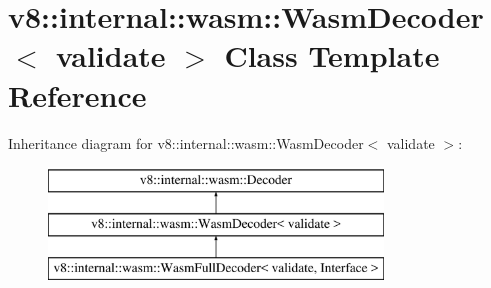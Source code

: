 \hypertarget{classv8_1_1internal_1_1wasm_1_1WasmDecoder}{}\section{v8\+:\+:internal\+:\+:wasm\+:\+:Wasm\+Decoder$<$ validate $>$ Class Template Reference}
\label{classv8_1_1internal_1_1wasm_1_1WasmDecoder}
Inheritance diagram for v8\+:\+:internal\+:\+:wasm\+:\+:Wasm\+Decoder$<$ validate $>$\+:\begin{figure}[H]
\begin{center}
\leavevmode
\includegraphics[height=3.000000cm]{classv8_1_1internal_1_1wasm_1_1WasmDecoder}
\end{center}
\end{figure}
